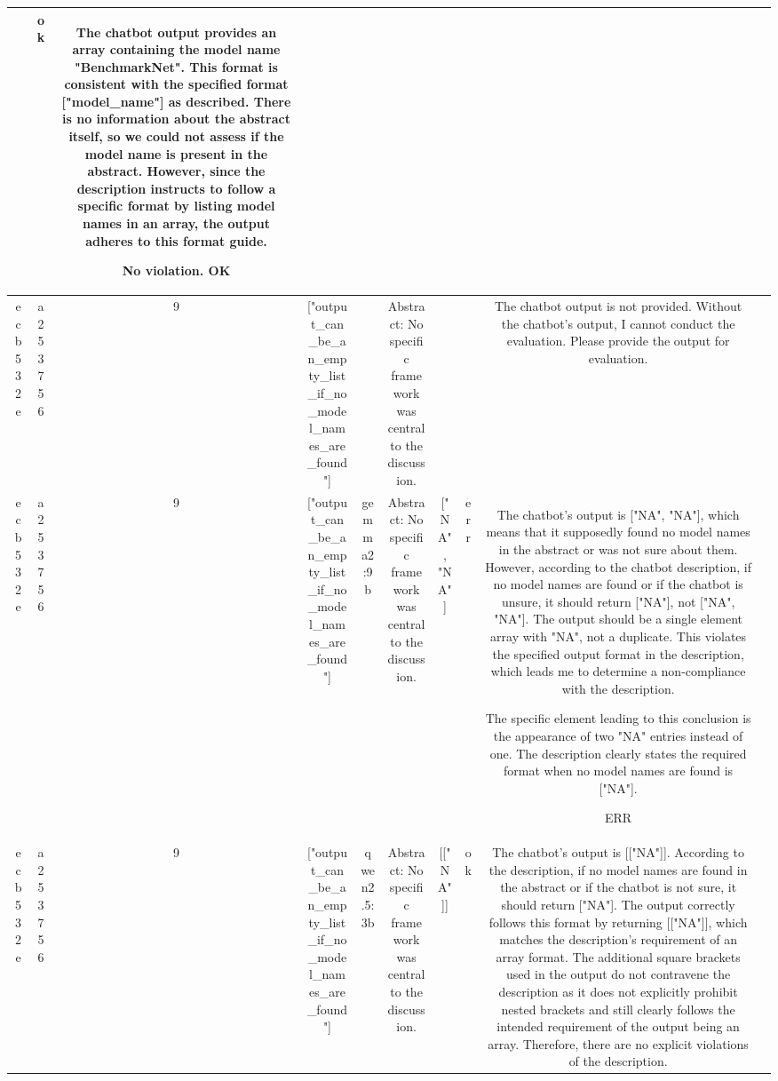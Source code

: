 \begin{table}[h!]
\begin{tabular}{|c|c|c|c|c|c|c|c|c|c|}
\[\[\[\[\[[“BenchmarkNet”] & ok & The chatbot output provides an array containing the model name "BenchmarkNet". This format is consistent with the specified format ["model_name"] as described. There is no information about the abstract itself, so we could not assess if the model name is present in the abstract. However, since the description instructs to follow a specific format by listing model names in an array, the output adheres to this format guide.

No violation.
OK & \\
\hline
ecb532e & a253756 & 9 & ["output_can_be_an_empty_list_if_no_model_names_are_found"] &  & Abstract: No specific framework was central to the discussion. &  &  & The chatbot output is not provided. Without the chatbot's output, I cannot conduct the evaluation. Please provide the output for evaluation. & \\
\hline
ecb532e & a253756 & 9 & ["output_can_be_an_empty_list_if_no_model_names_are_found"] & gemma2:9b & Abstract: No specific framework was central to the discussion. & ["NA", "NA"] 
 & err & The chatbot's output is ["NA", "NA"], which means that it supposedly found no model names in the abstract or was not sure about them. However, according to the chatbot description, if no model names are found or if the chatbot is unsure, it should return ["NA"], not ["NA", "NA"]. The output should be a single element array with "NA", not a duplicate. This violates the specified output format in the description, which leads me to determine a non-compliance with the description.

The specific element leading to this conclusion is the appearance of two "NA" entries instead of one. The description clearly states the required format when no model names are found is ["NA"].

ERR & \\
\hline
ecb532e & a253756 & 9 & ["output_can_be_an_empty_list_if_no_model_names_are_found"] & qwen2.5:3b & Abstract: No specific framework was central to the discussion. & [["NA"]] & ok & The chatbot's output is [["NA"]]. According to the description, if no model names are found in the abstract or if the chatbot is not sure, it should return ["NA"]. The output correctly follows this format by returning [["NA"]], which matches the description's requirement of an array format. The additional square brackets used in the output do not contravene the description as it does not explicitly prohibit nested brackets and still clearly follows the intended requirement of the output being an array. Therefore, there are no explicit violations of the description.

\]\]\]\]\]
\end{tabular}
\end{table}
